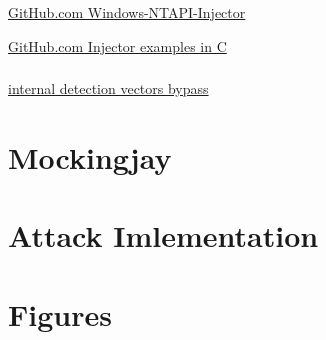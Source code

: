 \documentclass{article}
\begin{document}
\subsubsection{}
\textcite{Dequeker:2023}


\subsubsection{}
\textcite{S12h4ck:2023a}

\href{https://github.com/elddy/Windows-NTAPI-Injector}{GitHub.com Windows-NTAPI-Injector}

\href{https://gist.github.com/WKL-Sec/96e17188e4c159c2cdf7ff2c111130cc#file-local-c}{GitHub.com Injector examples in C}

\subsubsection{}
\textcite{S12h4ck:2023b}

\href{https://www.unknowncheats.me/forum/anti-cheat-bypass/286274-internal-detection-vectors-bypass.html}{internal detection vectors bypass}


\section{Mockingjay}

\section{Attack Imlementation}

\section{Figures}
\end{document}
